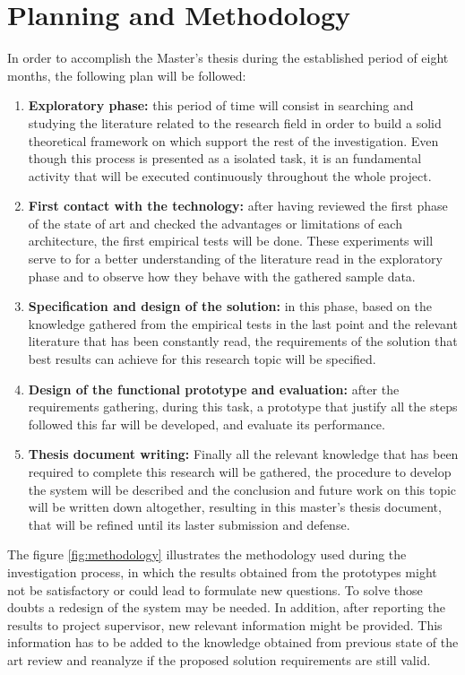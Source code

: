 \chapter{Planning and Methodology}

In order to accomplish the Master's thesis during the established period of eight months, the following plan will be followed:
\begin{enumerate}[label=\textbf{\arabic*}.]
    \item \textbf{Exploratory phase:} this period of time will consist in searching and studying the literature related to the research field in order to build a solid theoretical framework on which support the rest of the investigation. Even though this process is presented as a isolated task, it is an fundamental activity that will be executed continuously throughout the whole project.
    \item \textbf{First contact with the technology:} after having reviewed the first phase of the state of art and checked the advantages or limitations of each architecture, the first empirical tests will be done. These experiments will serve to for a better understanding of the literature read in the exploratory phase and to observe how they behave with the gathered sample data.
    \item \textbf{Specification and design of the solution:} in this phase, based on the knowledge gathered from the empirical tests in the last point and the relevant literature that has been constantly read, the requirements of the solution that best results can achieve for this research topic will be specified.
    \item \textbf{Design of the functional prototype and evaluation:} after the requirements gathering, during this task, a prototype that justify all the steps followed this far will be developed, and evaluate its performance.
    \item \textbf{Thesis document writing:} Finally all the relevant knowledge that has been required to complete this research will be gathered, the procedure to develop the system will be described and the conclusion and future work on this topic will be written down altogether, resulting in this master's thesis document, that will be refined until its laster submission and defense.
\end{enumerate}

The figure \ref{fig:methodology} illustrates the methodology used during the investigation process, in which the results obtained from the prototypes might not be satisfactory or could lead to formulate new questions. To solve those doubts a redesign of the system may be needed. In addition, after reporting the results to project supervisor, new relevant information might be provided. This information has to be added to the knowledge obtained from previous state of the art review and reanalyze if the proposed solution requirements are still valid. 

